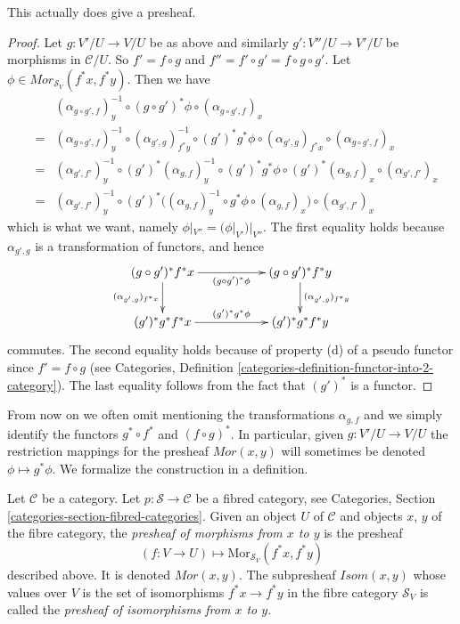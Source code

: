 \begin{lemma}
\label{lemma-painfull}
This actually does give a presheaf.
\end{lemma}

\begin{proof}
Let $g : V'/U \to V/U$ be as above and similarly
$g' : V''/U \to V'/U$ be morphisms in $\mathcal{C}/U$.
So $f' = f \circ g$ and $f'' = f' \circ g' = f \circ g \circ g'$.
Let $\phi \in {Mor}_{\mathcal{S}_V}(f^\ast x, f^\ast y)$.
Then we have
\begin{eqnarray*}
& &
(\alpha_{g \circ g', f})_y^{-1} \circ
(g \circ g')^\ast \phi \circ
(\alpha_{g \circ g', f})_x
\\
& = &
(\alpha_{g \circ g', f})_y^{-1} \circ
(\alpha_{g', g})_{f^*y}^{-1} \circ
(g')^*g^\ast \phi \circ
(\alpha_{g', g})_{f^*x} \circ
(\alpha_{g \circ g', f})_x
\\
& = &
(\alpha_{g', f'})_y^{-1} \circ
(g')^*(\alpha_{g, f})_y^{-1} \circ
(g')^* g^\ast \phi \circ
(g')^*(\alpha_{g, f})_x
\circ
(\alpha_{g', f'})_x
\\
& = &
(\alpha_{g', f'})_y^{-1} \circ
(g')^*\Big(
(\alpha_{g, f})_y^{-1} \circ
g^\ast \phi \circ
(\alpha_{g, f})_x
\Big) \circ
(\alpha_{g', f'})_x
\end{eqnarray*}
which is what we want, namely $\phi|_{V''} = (\phi|_{V'})|_{V''}$.
The first equality holds because
$\alpha_{g', g}$ is a transformation of functors, and hence
$$
\xymatrix{
(g \circ g')^*f^*x
\ar[rr]_{(g \circ g')^\ast \phi}
\ar[d]_{(\alpha_{g', g})_{f^*x}} & &
(g \circ g')^*f^*y
\ar[d]^{(\alpha_{g', g})_{f^*y}} \\
(g')^*g^*f^*x
\ar[rr]^{(g')^*g^\ast \phi} & &
(g')^*g^*f^*y
}
$$
commutes. The second equality holds because of property (d) of
a pseudo functor since $f' = f \circ g$ (see
Categories, Definition \ref{categories-definition-functor-into-2-category}).
The last equality follows from the fact that $(g')^*$ is a functor.
\end{proof}

\noindent
From now on we often omit mentioning the transformations
$\alpha_{g, f}$ and we simply identify the functors
$g^* \circ f^*$ and $(f \circ g)^*$. In particular,
given $g : V'/U \to V/U$ the restriction
mappings for the presheaf $\mathit{Mor}(x, y)$
will sometimes be denoted $\phi \mapsto g^*\phi$.
We formalize the construction in a definition.

\begin{definition}
\label{definition-mor-presheaf}
Let $\mathcal{C}$ be a category.
Let $p : \mathcal{S} \to \mathcal{C}$ be a fibred category,
see Categories, Section \ref{categories-section-fibred-categories}.
Given an object $U$ of $\mathcal{C}$ and objects
$x$, $y$ of the fibre category, the {\it presheaf
of morphisms from $x$ to $y$} is the presheaf
$$
(f : V \to U) \longmapsto \text{Mor}_{\mathcal{S}_V}(f^*x, f^*y)
$$
described above. It is denoted $\mathit{Mor}(x, y)$.
The subpresheaf $\mathit{Isom}(x, y)$ whose values
over $V$ is the set of isomorphisms
$f^*x \to f^*y$ in the fibre category $\mathcal{S}_V$
is called the {\it presheaf of isomorphisms from $x$ to $y$}.
\end{definition}

